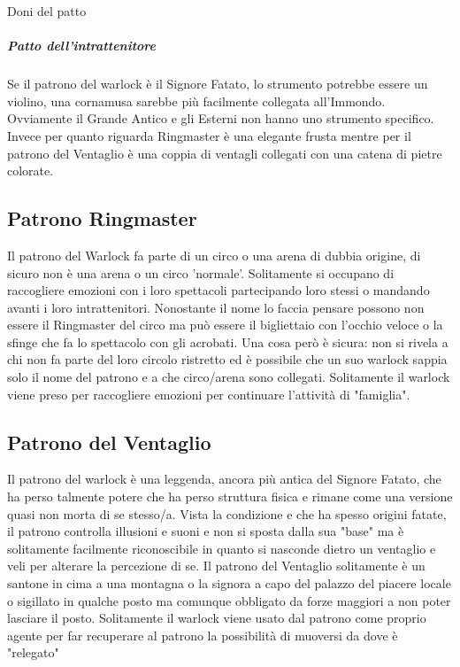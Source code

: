 \documentclass[letterpaper,twocolumn,openany,nodeprecatedcode]{dndbook}
\begin{document}
\begin{DndSidebar}[float=!h]{Doni del patto}
	\subparagraph{Patto dell'intrattenitore}
   Se il patrono del warlock è il Signore Fatato, lo strumento potrebbe essere un violino, una cornamusa sarebbe più facilmente collegata all'Immondo.
   Ovviamente il Grande Antico e gli Esterni non hanno uno strumento specifico.
   Invece per quanto riguarda Ringmaster è una elegante frusta mentre per il patrono del Ventaglio è una coppia di ventagli collegati con una catena di pietre colorate.
\end{DndSidebar}

\subsection{Patrono Ringmaster}
Il patrono del Warlock fa parte di un circo o una arena di dubbia origine, di sicuro non è una arena o un circo 'normale'. Solitamente si occupano di raccogliere emozioni con i loro spettacoli partecipando loro stessi o mandando avanti i loro intrattenitori. Nonostante il nome lo faccia pensare possono non essere il Ringmaster del circo ma può essere il bigliettaio con l'occhio veloce o la sfinge che fa lo spettacolo con gli acrobati. Una cosa però è sicura: non si rivela a chi non fa parte del loro circolo ristretto ed è possibile che un suo warlock sappia solo il nome del patrono e a che circo/arena sono collegati.
Solitamente il warlock viene preso per raccogliere emozioni per continuare l'attività di "famiglia".

\subsection{Patrono del Ventaglio}

Il patrono del warlock è una leggenda, ancora più antica del Signore Fatato, che ha perso talmente potere che ha perso struttura fisica e rimane come una versione quasi non morta di se stesso/a. Vista la condizione e che ha spesso origini fatate, il patrono controlla illusioni e suoni e non si sposta dalla sua "base" ma è solitamente facilmente riconoscibile in quanto si nasconde dietro un ventaglio e veli per alterare la percezione di se.
Il patrono del Ventaglio solitamente è un santone in cima a una montagna o la signora a capo del palazzo del piacere locale o sigillato in qualche posto ma comunque obbligato da forze maggiori a non poter lasciare il posto. Solitamente il warlock viene usato dal patrono come proprio agente per far recuperare al patrono la possibilità di muoversi da dove è "relegato"
\end{document}
